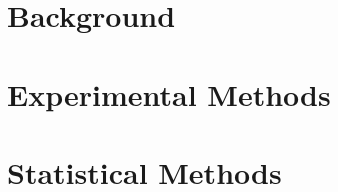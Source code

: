 



\newcommand\mycaptionoffset{2}   
\captionsetup[subfloat]{captionskip=\mycaptionoffset pt}
\newcommand{\resetcaptionoffset}{
	\captionsetup[subfloat]{captionskip=\mycaptionoffset pt}
}

\frontmatter
\pagestyle{plain}
\maketitle

\makecommittee

\newcommand{\chapterdir}{chapters}


\tableofcontents

\listoftodos

\mainmatter
\pagestyle{fancy}


\part{Background}




\part{Experimental Methods}






\part{Statistical Methods}


